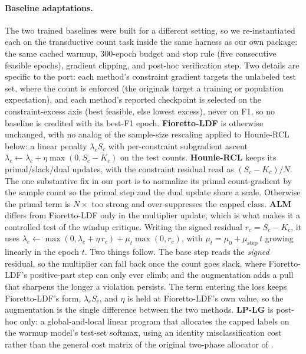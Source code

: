 \documentclass[10pt]{article}
\begin{document}
\paragraph{Baseline adaptations.}
The two trained baselines were built for a different setting, so we
re-instantiated each on the transductive count task inside the
same harness as our own package: the same cached warmup, $300$-epoch budget
and stop rule (five consecutive feasible epochs), gradient clipping, and
post-hoc verification step. Two details are specific to the port: each
method's constraint gradient targets the unlabeled test set, where the
count is enforced (the originals target a training or population
expectation), and each method's reported checkpoint is selected on the
constraint-excess axis (best feasible, else lowest excess), never on F1, so
no baseline is credited with its best-F1 epoch. \textbf{Fioretto-LDF} is
otherwise unchanged, with no analog of the sample-size rescaling applied to
Hounie-RCL below: a linear penalty $\lambda_c S_c$ with per-constraint
subgradient ascent
$\lambda_c\!\leftarrow\!\lambda_c+\eta\max(0,S_c\!-\!K_c)$ on the test
counts. \textbf{Hounie-RCL} keeps its primal/slack/dual updates, with the
constraint residual read as $(S_c\!-\!K_c)/N$. The one substantive fix in
our port is to normalize its primal count-gradient by the sample count so
the primal step and the dual update share a scale. Otherwise the primal
term is $N\times$ too strong and over-suppresses the capped class.
{\textbf{ALM} differs from Fioretto-LDF only in the multiplier update,
which is what makes it a controlled test of the windup critique. Writing the
signed residual $r_c\!=\!S_c\!-\!K_c$, it uses
$\lambda_c\!\leftarrow\!\max(0,\lambda_c\!+\!\eta\,r_c)+\mu_t\max(0,r_c)$, with
$\mu_t\!=\!\mu_0\!+\!\mu_{\mathrm{step}}\,t$ growing linearly in the epoch $t$.
Two things follow. The base step reads the \emph{signed} residual, so the
multiplier can fall back once the count goes slack, where Fioretto-LDF's
positive-part step can only ever climb; and the augmentation adds a pull that
sharpens the longer a violation persists. The term entering the loss keeps
Fioretto-LDF's form, $\lambda_c S_c$, and $\eta$ is held at Fioretto-LDF's own
value, so the augmentation is the single difference between the two methods.}
\textbf{LP-LG} is post-hoc only: a global-and-local linear program that
allocates the capped labels on the warmup model's test-set softmax, using
an identity misclassification cost rather than the general cost matrix
of the original two-phase allocator of
\citet{shifman2025classification}.
\end{document}
